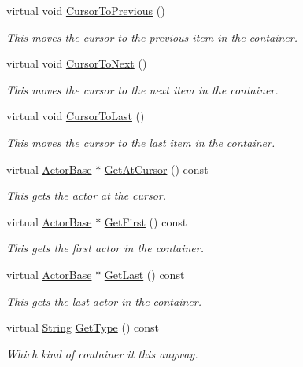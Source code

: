 \begin{DoxyCompactItemize}
virtual void \hyperlink{classphys_1_1ActorContainerVector_ac483bcdf348f55dc8b04a8805a002413}{CursorToPrevious} ()
\begin{DoxyCompactList}\small\item\em This moves the cursor to the previous item in the container. \item\end{DoxyCompactList}\item 
virtual void \hyperlink{classphys_1_1ActorContainerVector_a1c72366a6261d8e98dc0a9d2fad9f70f}{CursorToNext} ()
\begin{DoxyCompactList}\small\item\em This moves the cursor to the next item in the container. \item\end{DoxyCompactList}\item 
virtual void \hyperlink{classphys_1_1ActorContainerVector_aa6b08266bbb57a22c07ab50514e58db4}{CursorToLast} ()
\begin{DoxyCompactList}\small\item\em This moves the cursor to the last item in the container. \item\end{DoxyCompactList}\item 
virtual \hyperlink{classphys_1_1ActorBase}{ActorBase} $\ast$ \hyperlink{classphys_1_1ActorContainerVector_a280700490b368a963dd8feae044c7a6d}{GetAtCursor} () const 
\begin{DoxyCompactList}\small\item\em This gets the actor at the cursor. \item\end{DoxyCompactList}\item 
virtual \hyperlink{classphys_1_1ActorBase}{ActorBase} $\ast$ \hyperlink{classphys_1_1ActorContainerVector_a55ceecd017455f3185aa62798811e3c6}{GetFirst} () const 
\begin{DoxyCompactList}\small\item\em This gets the first actor in the container. \item\end{DoxyCompactList}\item 
virtual \hyperlink{classphys_1_1ActorBase}{ActorBase} $\ast$ \hyperlink{classphys_1_1ActorContainerVector_a211f6e419ef0b753cecf2c662a54511e}{GetLast} () const 
\begin{DoxyCompactList}\small\item\em This gets the last actor in the container. \item\end{DoxyCompactList}\item 
virtual \hyperlink{namespacephys_aa03900411993de7fbfec4789bc1d392e}{String} \hyperlink{classphys_1_1ActorContainerVector_a20d18213e69b3821ee973865df428e6d}{GetType} () const 
\begin{DoxyCompactList}\small\item\em Which kind of container it this anyway. \item\end{DoxyCompactList}\end{DoxyCompactItemize}
